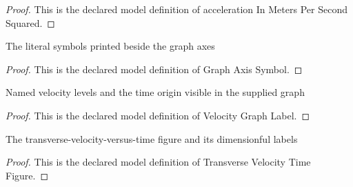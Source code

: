 \begin{proof}
  This is the declared model definition of acceleration In Meters Per Second Squared.
\end{proof}
\begin{definition}
  \label{def:physics:phyx-mini-0288:phyxminiproblems-problemphyxmini0288-graphaxissymbol}
  The literal symbols printed beside the graph axes
\end{definition}
\begin{proof}
  This is the declared model definition of Graph Axis Symbol.
\end{proof}
\begin{definition}
  \label{def:physics:phyx-mini-0288:phyxminiproblems-problemphyxmini0288-velocitygraphlabel}
  Named velocity levels and the time origin visible in the supplied graph
\end{definition}
\begin{proof}
  This is the declared model definition of Velocity Graph Label.
\end{proof}
\begin{definition}
  \label{def:physics:phyx-mini-0288:phyxminiproblems-problemphyxmini0288-transversevelocitytimefigure}
  The transverse-velocity-versus-time figure and its dimensionful labels
\end{definition}
\begin{proof}
  This is the declared model definition of Transverse Velocity Time Figure.
\end{proof}
